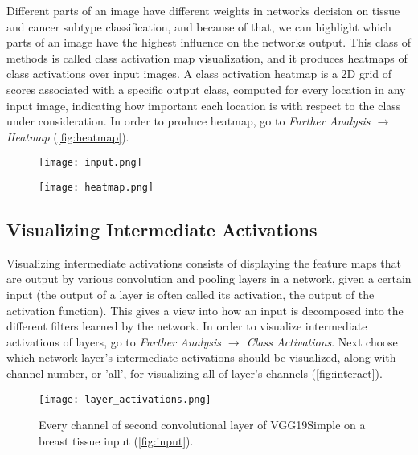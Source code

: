 Different parts of an image have different weights in networks decision on tissue and cancer subtype classification, and because of that, we can highlight which parts of an image have the highest influence on the networks output. This class of methods is called class activation map visualization, and it produces heatmaps of class activations over input images. A class activation heatmap is a 2D grid of scores associated with a specific output class, computed for every location in any input image, indicating how important each location is with respect to the class under consideration. In order to produce heatmap, go to \emph{Further Analysis $\rightarrow$ Heatmap} (\textcolor{red}{\autoref{fig:heatmap}}).

\begin{figure}[h]
	\centering
	\begin{minipage}{.5\textwidth}
		\centering
		\texttt{[image: input.png]}
		\label{fig:input}
	\end{minipage}%
	\begin{minipage}{.5\textwidth}
		\centering
		\texttt{[image: heatmap.png]}
		\label{fig:heatmap}
	\end{minipage}
\end{figure}

\subsection{Visualizing Intermediate Activations}

Visualizing intermediate activations consists of displaying the feature maps that are output by various convolution and pooling layers in a network, given a certain input (the output of a layer is often called its activation, the output of the activation function). This gives a view into how an input is decomposed into the different filters learned by the network. In order to visualize intermediate activations of layers, go to \emph{Further Analysis $\rightarrow$ Class Activations}. Next choose which network layer's intermediate activations should be visualized, along with channel number, or 'all', for visualizing all of layer's channels  (\textcolor{red}{\autoref{fig:interact}}).
\clearpage

\begin{figure}[h]
	\centering
	\texttt{[image: layer\_activations.png]}
	\caption{Every channel of second convolutional layer of VGG19Simple on a breast tissue input (\textcolor{red}{\autoref{fig:input}}).}
	\label{fig:interact}
\end{figure}

